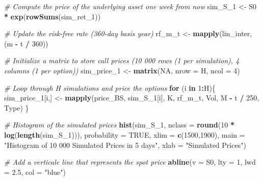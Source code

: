 \documentclass[]{article}
\newenvironment{Shaded}{\begin{snugshade}}{\end{snugshade}}
\newcommand{\CommentTok}[1]{\textcolor[rgb]{0.56,0.35,0.01}{\textit{#1}}}
\newcommand{\ControlFlowTok}[1]{\textcolor[rgb]{0.13,0.29,0.53}{\textbf{#1}}}
\newcommand{\DataTypeTok}[1]{\textcolor[rgb]{0.13,0.29,0.53}{#1}}
\newcommand{\DecValTok}[1]{\textcolor[rgb]{0.00,0.00,0.81}{#1}}
\newcommand{\FloatTok}[1]{\textcolor[rgb]{0.00,0.00,0.81}{#1}}
\newcommand{\KeywordTok}[1]{\textcolor[rgb]{0.13,0.29,0.53}{\textbf{#1}}}
\newcommand{\NormalTok}[1]{#1}
\newcommand{\OperatorTok}[1]{\textcolor[rgb]{0.81,0.36,0.00}{\textbf{#1}}}
\newcommand{\OtherTok}[1]{\textcolor[rgb]{0.56,0.35,0.01}{#1}}
\newcommand{\StringTok}[1]{\textcolor[rgb]{0.31,0.60,0.02}{#1}}
\begin{document}
\begin{Shaded}
\begin{Highlighting}[]
\CommentTok{\# Compute the price of the underlying asset one week from now}
\NormalTok{sim\_S\_}\DecValTok{1}\NormalTok{ <{-}}\StringTok{ }\NormalTok{S0 }\OperatorTok{*}\StringTok{ }\KeywordTok{exp}\NormalTok{(}\KeywordTok{rowSums}\NormalTok{(sim\_ret\_}\DecValTok{1}\NormalTok{))}

\CommentTok{\# Update the risk{-}free rate (360{-}day basis year)}
\NormalTok{rf\_m\_t <{-}}\StringTok{ }\KeywordTok{mapply}\NormalTok{(lin\_inter, (m }\OperatorTok{{-}}\StringTok{ }\NormalTok{t }\OperatorTok{/}\StringTok{ }\DecValTok{360}\NormalTok{))}

\CommentTok{\# Initialize a matrix to store call prices (10 000 rows (1 per simulation), 4 columns (1 per option))}
\NormalTok{sim\_price\_}\DecValTok{1}\NormalTok{ <{-}}\StringTok{ }\KeywordTok{matrix}\NormalTok{(}\OtherTok{NA}\NormalTok{, }\DataTypeTok{nrow =}\NormalTok{ H, }\DataTypeTok{ncol =} \DecValTok{4}\NormalTok{)}

\CommentTok{\# Loop through H simulations and price the options}
\ControlFlowTok{for}\NormalTok{ (i }\ControlFlowTok{in} \DecValTok{1}\OperatorTok{:}\NormalTok{H)\{}
\NormalTok{  sim\_price\_}\DecValTok{1}\NormalTok{[i,] <{-}}\StringTok{ }\KeywordTok{mapply}\NormalTok{(price\_BS, sim\_S\_}\DecValTok{1}\NormalTok{[i], K, rf\_m\_t, Vol, M }\OperatorTok{{-}}\StringTok{ }\NormalTok{t }\OperatorTok{/}\StringTok{ }\DecValTok{250}\NormalTok{, Type)}
\NormalTok{\}}

\CommentTok{\# Histogram of the simulated prices}
\KeywordTok{hist}\NormalTok{(sim\_S\_}\DecValTok{1}\NormalTok{, }\DataTypeTok{nclass =} \KeywordTok{round}\NormalTok{(}\DecValTok{10} \OperatorTok{*}\StringTok{ }\KeywordTok{log}\NormalTok{(}\KeywordTok{length}\NormalTok{(sim\_S\_}\DecValTok{1}\NormalTok{))),}
              \DataTypeTok{probability =} \OtherTok{TRUE}\NormalTok{, }\DataTypeTok{xlim =} \KeywordTok{c}\NormalTok{(}\DecValTok{1500}\NormalTok{,}\DecValTok{1900}\NormalTok{),}
              \DataTypeTok{main =} \StringTok{"Histogram of 10 000 Simulated Prices in 5 days"}\NormalTok{,}
              \DataTypeTok{xlab =} \StringTok{"Simulated Prices"}\NormalTok{)}

\CommentTok{\# Add a verticale line that represents the spot price}
\KeywordTok{abline}\NormalTok{(}\DataTypeTok{v   =}\NormalTok{ S0,}
       \DataTypeTok{lty =} \DecValTok{1}\NormalTok{,}
       \DataTypeTok{lwd =} \FloatTok{2.5}\NormalTok{,}
       \DataTypeTok{col =} \StringTok{"blue"}\NormalTok{)}
\end{Highlighting}
\end{Shaded}
\end{document}
